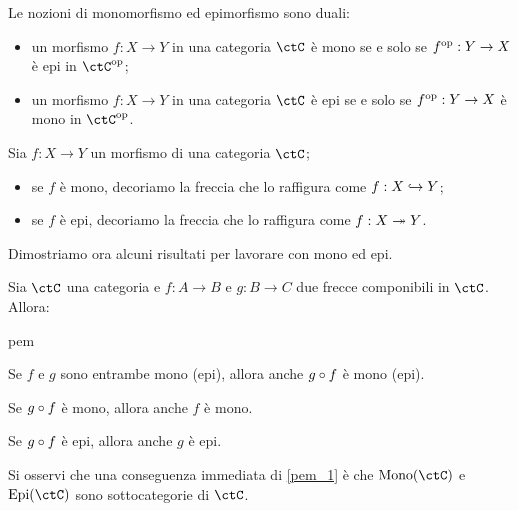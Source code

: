 \begin{remark}
	\label{rmk:mono-epi-duality}
	Le nozioni di monomorfismo ed epimorfismo sono duali:
	\begin{itemize}
		\item un morfismo \(f : X\to Y\) in una categoria \(\ctC\) è mono se e solo se \(f^{\text{op}} : Y\to X\) è epi in \(\ctC^{\op}\);
		\item un morfismo \(f : X\to Y\) in una categoria \(\ctC\) è epi se e solo se \(f^{\text{op}} : Y\to X\) è mono in \(\ctC^{\op}\).
	\end{itemize}
\end{remark}
\begin{notation}
	Sia \(f : X\to Y\) un morfismo di una categoria \(\ctC\);
	\begin{itemize}
		\item se \(f\) è mono, decoriamo la freccia che lo raffigura come \(f : X\hookrightarrow Y\);
		\item se \(f\) è epi, decoriamo la freccia che lo raffigura come \(f : X\twoheadrightarrow Y\).
	\end{itemize}
\end{notation}
Dimostriamo ora alcuni risultati per lavorare con mono ed epi.
\begin{proposition}\label{canc_monoepi}
	Sia \(\ctC\) una categoria e \(f \colon A \to B\) e \(g \colon B \to C\) due frecce componibili in \(\ctC\).
	Allora:
	\begin{enumtag}{pem}
		\item \label{pem_1} Se \(f\) e \(g\) sono entrambe mono (epi), allora anche \(g \circ f\) è mono (epi).
		\item \label{pem_2} Se \(g \circ f\) è mono, allora anche \(f\) è mono.
		\item \label{pem_3} Se \(g \circ f\) è epi, allora anche \(g\) è epi.
	\end{enumtag}
\end{proposition}
Si osservi che una conseguenza immediata di \ref{pem_1} è che \(\Mono[\ctC]\) e \(\Epi[\ctC]\) sono sottocategorie di \(\ctC\).
